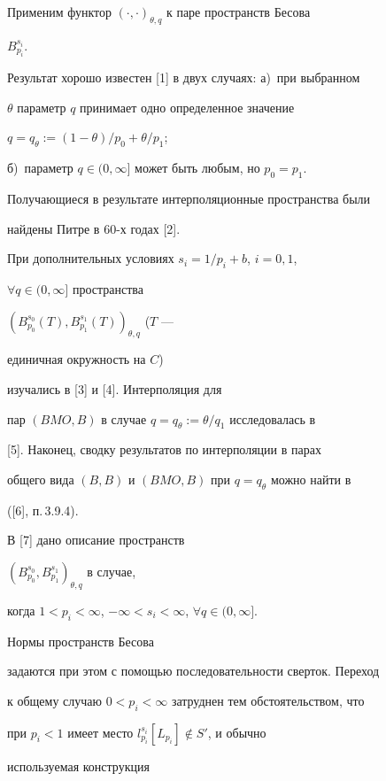 \label{begin} 


 


Применим функтор $(\cdot,\cdot)_{\theta,q}$ к паре пространств Бесова 


$B^{s_i}_{p_i}$. 


Результат хорошо известен [1] в двух случаях: а)~при выбранном 


$\theta$ параметр $q$ принимает одно определенное значение 


$q=q_\theta:=(1-\theta)/p_0+\theta/p_1$; 


б)~параметр $q\in(0,\infty]$ может быть любым, но $p_0=p_1$. 


Получающиеся в результате интерполяционные пространства были 


найдены Питре в 60-х годах [2]. 


 


При дополнительных условиях $s_i{=}1/p_i+b$, $i=0,1$, 


$\forall q{\in}(0,\infty]$ пространства 


$(B^{s_0}_{p_0}(T),B^{s_1}_{p_1}(T))_{\theta,q}$ ($T$ --- 


единичная окружность на $C$) 


изучались в [3] и [4]. Интерполяция для 


пар $(BMO,B)$ в случае $q=q_\theta:=\theta/q_1$ исследовалась в 


[5]. Наконец, сводку результатов по интерполяции в парах 


общего вида $(B,B)$ и $(BMO,B)$ при $q=q_\theta$ можно найти в 


([6], п.\,3.9.4). 


 


В [7] дано описание пространств 


$(B^{s_0}_{p_0},B^{s_1}_{p_1})_{\theta,q}$ в случае, 


когда $1<p_i<\infty$, $-\infty<s_i<\infty$, $\forall q\in(0,\infty]$. 


Нормы пространств Бесова 


задаются при этом с помощью последовательности сверток. Переход 


к общему случаю $0<p_i<\infty$ затруднен тем обстоятельством, что 


при $p_i<1$ имеет место $l^{s_i}_{p_i}[L_{p_i}]\notin S'$, и обычно 


используемая конструкция 


